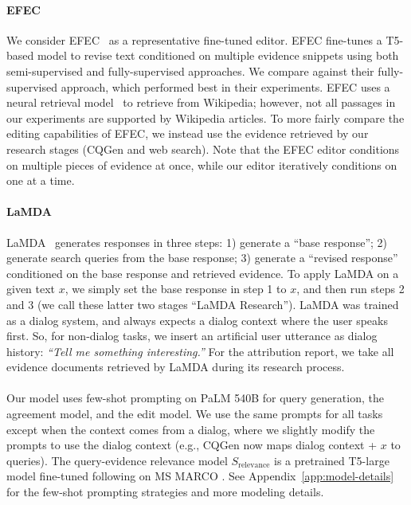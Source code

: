 \documentclass[11pt]{article}
\begin{document}
\paragraph{EFEC}
We consider EFEC~\cite{thorne2021evidence} as a representative fine-tuned editor.
EFEC fine-tunes a T5-based model to revise text conditioned on multiple evidence snippets using both semi-supervised and fully-supervised approaches.
We compare against their fully-supervised approach, which performed best in their experiments.
EFEC uses a neural retrieval model~\cite{karpukhin2020dpr} to retrieve from Wikipedia; however, not all passages in our experiments are supported by Wikipedia articles.
To more fairly compare the editing capabilities of EFEC, we instead use the evidence retrieved by our research stages (CQGen and web search). %
Note that the EFEC editor conditions on multiple pieces of evidence at once, while our editor iteratively conditions on one at a time.


\paragraph{LaMDA}
LaMDA~\cite{Thoppilan2022LaMDA} generates responses in three steps: 
1) generate a ``base response'';
2) generate search queries from the base response;
3) generate a ``revised response'' conditioned on the base response and retrieved evidence.
To apply LaMDA on a given text $x$, we simply set the base response in step 1 to $x$, and then run steps 2 and 3 (we call these latter two stages ``LaMDA Research'').
LaMDA was trained as a dialog system, and always expects a dialog context where the user speaks first.
So, for non-dialog tasks, we insert an artificial user utterance as dialog history: \emph{``Tell me something interesting.''}
For the attribution report, we take all evidence documents retrieved by LaMDA during its research process.

\paragraph{\approach{}}
Our model uses few-shot prompting on PaLM 540B for query generation, the agreement model, and the edit model.
We use the same prompts for all tasks except when the context comes from a dialog,
    where we slightly modify the prompts to use the dialog context (e.g., CQGen now maps dialog context + $x$ to queries).
The query-evidence relevance model $S_\text{relevance}$ is a pretrained T5-large model \cite{raffel20t5} fine-tuned following \citet{ni2021gtr} on MS MARCO \cite{nguyen2016msmarco}.
See Appendix~\ref{app:model-details} for the few-shot prompting strategies and more modeling details.
\end{document}
